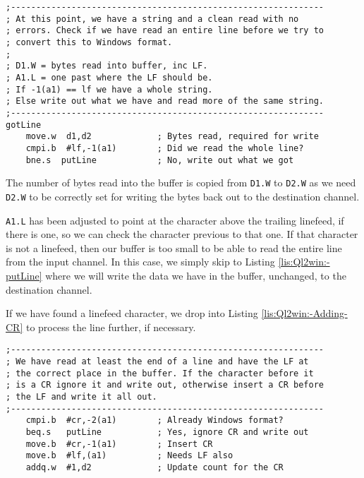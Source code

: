 \begin{lstlisting}[caption={Ql2win: gotLine},label={lis:Ql2win:-gotLine},firstnumber=106]
;--------------------------------------------------------------
; At this point, we have a string and a clean read with no
; errors. Check if we have read an entire line before we try to
; convert this to Windows format.
;
; D1.W = bytes read into buffer, inc LF.
; A1.L = one past where the LF should be.
; If -1(a1) == lf we have a whole string.
; Else write out what we have and read more of the same string.
;--------------------------------------------------------------
gotLine
    move.w  d1,d2             ; Bytes read, required for write
    cmpi.b  #lf,-1(a1)        ; Did we read the whole line?
    bne.s  putLine            ; No, write out what we got
\end{lstlisting}

The number of bytes read into the buffer is copied from \lstinline[basicstyle={\ttfamily},showstringspaces=false]!D1.W!
to \lstinline[basicstyle={\ttfamily},showstringspaces=false]!D2.W!
as we need \lstinline[basicstyle={\ttfamily},showstringspaces=false]!D2.W!
to be correctly set for writing the bytes back out to the destination
channel. 

\lstinline[basicstyle={\ttfamily},showstringspaces=false]!A1.L! has
been adjusted to point at the character above the trailing linefeed,
if there is one, so we can check the character previous to that one.
If that character is not a linefeed, then our buffer is too small
to be able to read the entire line from the input channel. In this
case, we simply skip to Listing \ref{lis:Ql2win:-putLine} where we
will write the data we have in the buffer, unchanged, to the destination
channel.

If we have found a linefeed character, we drop into Listing \ref{lis:Ql2win:-Adding-CR}
to process the line further, if necessary.

\begin{lstlisting}[caption={Ql2win: Adding a CR},label={lis:Ql2win:-Adding-CR},firstnumber=120]
;--------------------------------------------------------------
; We have read at least the end of a line and have the LF at 
; the correct place in the buffer. If the character before it
; is a CR ignore it and write out, otherwise insert a CR before
; the LF and write it all out.
;--------------------------------------------------------------
    cmpi.b  #cr,-2(a1)        ; Already Windows format?
    beq.s   putLine           ; Yes, ignore CR and write out
    move.b  #cr,-1(a1)        ; Insert CR
    move.b  #lf,(a1)          ; Needs LF also
    addq.w  #1,d2             ; Update count for the CR
\end{lstlisting}

